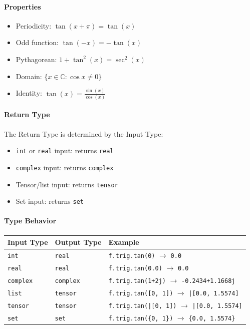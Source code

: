 \paragraph{Properties}
\begin{itemize}
\item Periodicity: $\tan(x + \pi) = \tan(x)$
\item Odd function: $\tan(-x) = -\tan(x)$
\item Pythagorean: $1 + \tan^2(x) = \sec^2(x)$
\item Domain: $\{x \in \mathbb{C} : \cos x \neq 0\}$
\item Identity: $\tan(x) = \frac{\sin(x)}{\cos(x)}$
\end{itemize}

\paragraph{Return Type}
The Return Type is determined by the Input Type:
\begin{itemize}
\item \texttt{int} or \texttt{real} input: returns \texttt{real}
\item \texttt{complex} input: returns \texttt{complex}
\item Tensor/list input: returns \texttt{tensor}
\item Set input: returns \texttt{set}
\end{itemize}

\paragraph{Type Behavior}
\begin{center}
\begin{tabular}{lll}
\textbf{Input Type} & \textbf{Output Type} & \textbf{Example} \\ \hline
\texttt{int} & \texttt{real} & \texttt{f.trig.tan(0)} $\to$ \texttt{0.0} \\
\texttt{real} & \texttt{real} & \texttt{f.trig.tan(0.0)} $\to$ \texttt{0.0} \\
\texttt{complex} & \texttt{complex} & \texttt{f.trig.tan(1+2j)} $\to$ \texttt{-0.2434+1.1668j} \\
\texttt{list} & \texttt{tensor} & \texttt{f.trig.tan([0, 1])} $\to$ \texttt{|[0.0, 1.5574]} \\
\texttt{tensor} & \texttt{tensor} & \texttt{f.trig.tan(|[0, 1])} $\to$ \texttt{|[0.0, 1.5574]} \\
\texttt{set} & \texttt{set} & \texttt{f.trig.tan(\{0, 1\})} $\to$ \texttt{\{0.0, 1.5574\}} \\
\end{tabular}
\end{center}


